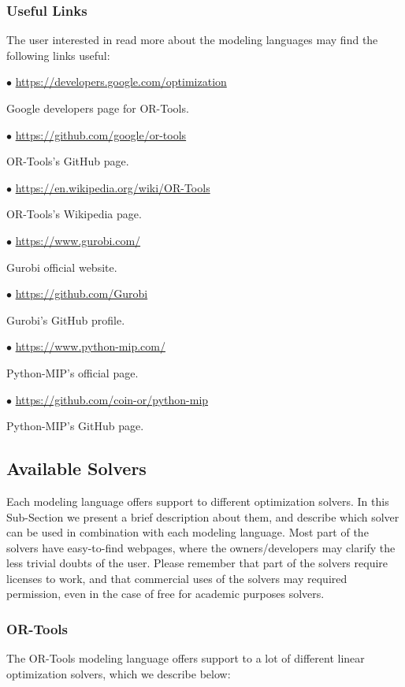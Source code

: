 \documentclass[12pt,hidelinks]{article}
\begin{document}
	\subsubsection{Useful Links}
		The user interested in read more about the modeling languages may find the following links useful:

		$\bullet$ \url{https://developers.google.com/optimization}

		Google developers page for OR-Tools.

		$\bullet$ \url{https://github.com/google/or-tools}

		OR-Tools's GitHub page.

		$\bullet$ \url{https://en.wikipedia.org/wiki/OR-Tools}

		OR-Tools's Wikipedia page.

		$\bullet$ \url{https://www.gurobi.com/}

		Gurobi official website.

		$\bullet$ \url{https://github.com/Gurobi}

		Gurobi's GitHub profile.

		$\bullet$ \url{https://www.python-mip.com/}

		Python-MIP's official page.

		$\bullet$ \url{https://github.com/coin-or/python-mip}

		Python-MIP's GitHub page.

	\subsection{Available Solvers}

	Each modeling language offers support to different optimization solvers. In this Sub-Section we present a brief description about them, and describe which solver can be used in combination with each modeling language. Most part of the solvers have easy-to-find webpages, where the owners/developers may clarify the less trivial doubts of the user. Please remember that part of the solvers require licenses to work, and that commercial uses of the solvers may required permission, even in the case of free for academic purposes solvers.

	\subsubsection{OR-Tools}

		The OR-Tools modeling language offers support to a lot of different linear optimization solvers, which we describe below:
\end{document}
